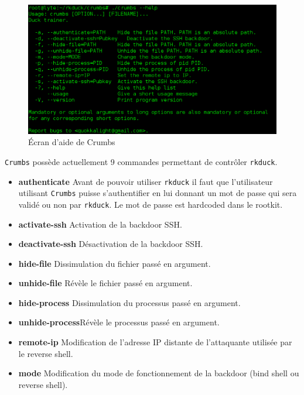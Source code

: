 \documentclass[12pt]{article}
\begin{document}
        \begin{figure}[H] 
        \begin{center}
        \includegraphics[scale=0.5]{./img/crumbs-help.png}

        \caption[dsfsdf]{Écran d'aide de Crumbs}
        \end{center}
        \end{figure}

        \texttt{Crumbs} possède actuellement 9 commandes permettant de contrôler \texttt{rkduck}.
        \begin{itemize}
            \item \textbf{authenticate} Avant de pouvoir utiliser \texttt{rkduck} il faut que l'utilisateur utilisant \texttt{Crumbs} puisse s'authentifier en lui donnant un mot de passe qui sera validé ou non par \texttt{rkduck}. Le mot de passe est hardcoded dans le rootkit.
            \item \textbf{activate-ssh} Activation de la backdoor SSH. 
            \item \textbf{deactivate-ssh} Désactivation de la backdoor SSH.
            \item \textbf{hide-file} Dissimulation du fichier passé en argument.
            \item \textbf{unhide-file} Révèle le fichier passé en argument.
            \item \textbf{hide-process} Dissimulation du processus passé en argument.
            \item \textbf{unhide-process}Révèle le processus passé en argument.
            \item \textbf{remote-ip} Modification de l'adresse IP distante de l'attaquante utilisée par le reverse shell.
            \item \textbf{mode} Modification du mode de fonctionnement de la backdoor (bind shell ou reverse shell).
        \end{itemize}
        
\end{document}
